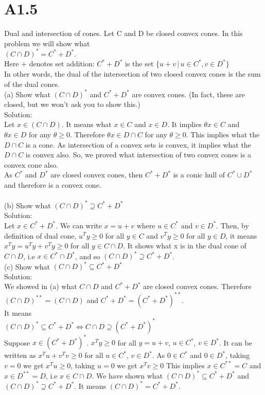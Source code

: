 \documentclass{article}
\begin{document}
\section*{A1.5}
Dual and intersection of cones. Let C and D be closed convex cones. In this problem we will show what \\
$(C \cap D )^* = C^* + D^*$. \\
Here $+$ denotes set addition: $C^* + D^*$ is the set 
$\{u + v \, | \, u \in C^*, v \in D^*\}$ \\
In other words, the dual of the intersection of two closed convex cones is the sum of the dual cones. \\

(a) Show what $(C \cap D )^*$ and $C^* + D^*$ are convex cones. (In fact, these are closed, but
we won't ask you to show this.) \\
Solution: \\
Let $x \in (C \cap D )$. It means what $x \in C$ and $x \in D$. It implies $\theta x \in C$ and $\theta x \in D$ 
for any $\theta \geq 0$. Therefore $\theta x \in D \cap C$ for any $\theta \geq 0$. This implies what the $D \cap C$ is a cone. As intersection of a convex sets is convex, it implies what the $D \cap C$ is convex also. So, we proved what intersection of two convex cones is a convex cone also. \\
As $C^*$ and $D^*$ are closed convex cones, then $C^* + D^*$ is a conic hull of $C^* \cup D^*$ and therefore is a convex cone.\\ \\

(b) Show what $(C \cap D)^* \supseteq C^* + D^*$\\
Solution:\\
Let $x \in C^* + D^*$. We can write $x = u + v$ where 
$u \in C^*$ and $v \in D^*$. Then, by definition of dual cone, $u^T y \geq 0$ for all $y \in C$ and 
$v^T y \geq 0$ for all $y \in D$, it means 
$x^T y = u^T y + v^T y \geq 0$ for all $y \in C \cap D$. It shows what x is in the dual cone of $C \cap D$, i.e 
$x \in C^* \cap D^*$, and so $(C \cap D)^* \supseteq C^* + D^*$. \\

(c) Show what $(C \cap D)^* \subseteq C^* + D^*$ \\
Solution: \\
We showed in (a) what $C \cap D$ and $C^* + D^*$ are closed convex cones. Therefore 
$(C \cap D)^{**} = (C \cap D)$ and 
$C^* + D^* = (C^* + D^*)^{**}$. 
\\ It means \\ 
$(C \cap D)^* \subseteq C^* + D^* \Longleftrightarrow 
C \cap D \supseteq (C^* + D^*)^*$ \\
Suppose $x \in (C^* + D^*)^*$. $x^T y \geq 0 $ for all 
$y = u + v$, $u \in C^*$, $v \in D^*$. It can be written as $x^T u + v^T v \geq 0$  for all $u \in C^*$, $v \in D^*$. As $0 \in C^*$ and $0 \in D^*$, taking $v = 0$ we get $x^T u \geq 0$,  taking $u = 0$ we get $x^T v \geq 0$
This implies $x \in C^{**} = C$ and $x \in D^{**} = D$, 
i.e $x \in C \cap D$. We have shown what $(C \cap D)^* \subseteq C^* + D^*$ and $(C \cap D)^* \supseteq C^* + D^*$. It means $(C \cap D)^* = C^* + D^*$. \\
\end{document}
